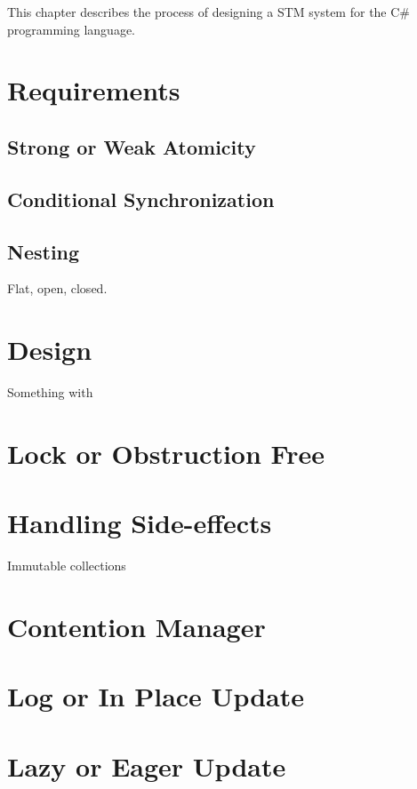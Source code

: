 \makeatletter {}\makeatother
{}
This chapter describes the process of designing a \ac{STM} system for the C\# programming language.
\label{chap:stm_design}
\section{Requirements}
\subsection{Strong or Weak Atomicity}
\subsection{Conditional Synchronization}
\subsection{Nesting}
Flat, open, closed.

\section{Design}
Something with\cite[p. 1]{harris2003language}


\section{Lock or Obstruction Free}
\section{Handling Side-effects}
Immutable collections
\section{Contention Manager}
\section{Log or In Place Update}
\section{Lazy or Eager Update}



\worksheetend
